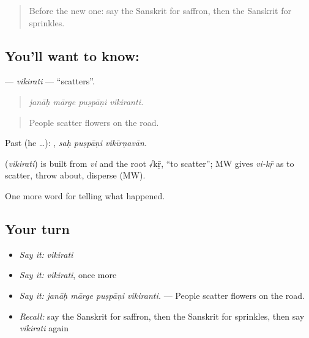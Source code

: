 \label{lesson:SA-C327-vikirati}



\begin{quote}
Before the new one: say the Sanskrit for saffron, then the Sanskrit for sprinkles.
\end{quote}

\subsection*{You'll want to know: }
\textbf{} — \emph{vikirati} — \textquotedblleft{}scatters\textquotedblright{}.

\begin{quote}
   
\end{quote}

\begin{quote}
\emph{janāḥ mārge puṣpāṇi vikiranti.}
\end{quote}

\begin{quote}
People scatter flowers on the road.
\end{quote}

Past (he …):   , \emph{saḥ puṣpāṇi vikīrṇavān}.

\begin{cousinweb}
\textbf{} (\emph{vikirati}) is built from \emph{vi} and the root √kṝ, \textquotedblleft{}to scatter\textquotedblright{}; MW gives \emph{vi-kṝ} as to scatter, throw about, disperse (MW).
\end{cousinweb}

\begin{grammarlens}[title={What you've built}]
One more word for telling what happened.
\end{grammarlens}

\subsection*{Your turn}
\begin{itemize}
\raggedright
  \item \emph{Say it:} \emph{vikirati}
  \item \emph{Say it:} \emph{vikirati}, once more
  \item \emph{Say it:} \emph{janāḥ mārge puṣpāṇi vikiranti.} — People scatter flowers on the road.
  \item \emph{Recall:} say the Sanskrit for saffron, then the Sanskrit for sprinkles, then say \emph{vikirati} again
\end{itemize}

